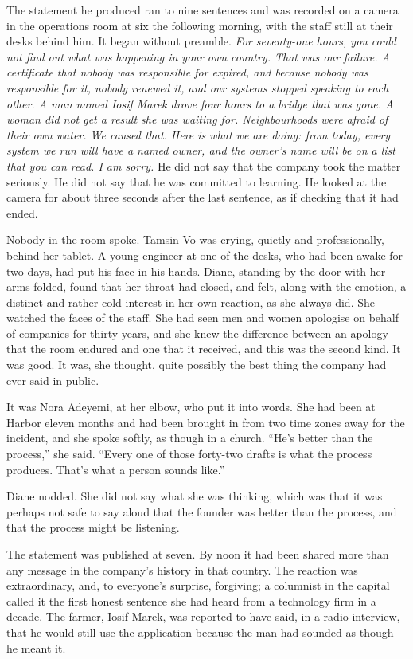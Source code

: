 The statement he produced ran to nine sentences and was recorded on a camera in the operations room at six the following morning, with the staff still at their desks behind him. It began without preamble. \emph{For seventy-one hours, you could not find out what was happening in your own country. That was our failure. A certificate that nobody was responsible for expired, and because nobody was responsible for it, nobody renewed it, and our systems stopped speaking to each other. A man named Iosif Marek drove four hours to a bridge that was gone. A woman did not get a result she was waiting for. Neighbourhoods were afraid of their own water. We caused that. Here is what we are doing: from today, every system we run will have a named owner, and the owner's name will be on a list that you can read. I am sorry.} He did not say that the company took the matter seriously. He did not say that he was committed to learning. He looked at the camera for about three seconds after the last sentence, as if checking that it had ended.

Nobody in the room spoke. Tamsin Vo was crying, quietly and professionally, behind her tablet. A young engineer at one of the desks, who had been awake for two days, had put his face in his hands. Diane, standing by the door with her arms folded, found that her throat had closed, and felt, along with the emotion, a distinct and rather cold interest in her own reaction, as she always did. She watched the faces of the staff. She had seen men and women apologise on behalf of companies for thirty years, and she knew the difference between an apology that the room endured and one that it received, and this was the second kind. It was good. It was, she thought, quite possibly the best thing the company had ever said in public.

It was Nora Adeyemi, at her elbow, who put it into words. She had been at Harbor eleven months and had been brought in from two time zones away for the incident, and she spoke softly, as though in a church. ``He's better than the process,'' she said. ``Every one of those forty-two drafts is what the process produces. That's what a person sounds like.''

Diane nodded. She did not say what she was thinking, which was that it was perhaps not safe to say aloud that the founder was better than the process, and that the process might be listening.

The statement was published at seven. By noon it had been shared more than any message in the company's history in that country. The reaction was extraordinary, and, to everyone's surprise, forgiving; a columnist in the capital called it the first honest sentence she had heard from a technology firm in a decade. The farmer, Iosif Marek, was reported to have said, in a radio interview, that he would still use the application because the man had sounded as though he meant it.

